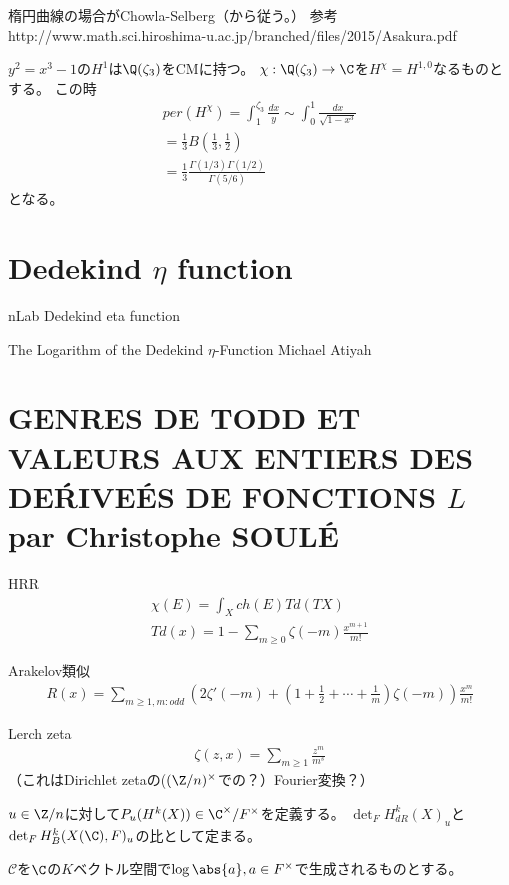 \documentclass{jsarticle}
\begin{document}
楕円曲線の場合がChowla-Selberg（から従う。）
参考 http://www.math.sci.hiroshima-u.ac.jp/branched/files/2015/Asakura.pdf

$y^2=x^3-1$の$H^1$は$\Q(\zeta_3)$をCMに持つ。
$\chi:\Q(\zeta_3) \to \C$を$H^\chi=H^{1,0}$なるものとする。
この時
\begin{align*}
per(H^{\chi})=\int^{\zeta_3}_1\frac{dx}{y}\sim\int^1_0\frac{dx}{\sqrt{1-x^3}}\\
=\frac{1}{3}B(\frac{1}{3},\frac{1}{2})\\
=\frac{1}{3}\frac{\Gamma(1/3)\Gamma(1/2)}{\Gamma(5/6)}
\end{align*}
となる。

\section{Dedekind $\eta$ function}
nLab
Dedekind eta function

The Logarithm of the Dedekind $\eta$-Function
Michael Atiyah

\section{GENRES DE TODD ET VALEURS AUX ENTIERS DES DE\'RIVE\'ES DE FONCTIONS $L$
par Christophe SOUL\'E}

HRR
\begin{align*}
\chi(E)=\int_Xch(E)Td(TX)\\
Td(x)=1-\sum_{m\geq0}\zeta(-m)\frac{x^{m+1}}{m!}
\end{align*}

Arakelov類似
\begin{align*}
R(x)=\sum_{m\geq1, m:odd}(2\zeta'(-m)+(1+\frac{1}{2}+\cdots+\frac{1}{m})\zeta(-m))\frac{x^m}{m!}
\end{align*}

Lerch zeta
\begin{align*}
\zeta(z,x)=\sum_{m\geq1}\frac{z^m}{m^s}
\end{align*}
（これはDirichlet zetaの($(\Z/n)^\times$での？）Fourier変換？）

$u\in\Z/n$に対して$P_u(H^k(X))\in\C^\times/F^\times$を定義する。
$\det_FH^k_{dR}(X)_u$と$\det_FH^k_B(X(\C),F)_u$の比として定まる。

$\mathcal{C}$を$\C$の$K$ベクトル空間で$\log\abs{a}, a\in F^\times$で生成されるものとする。
\end{document}
